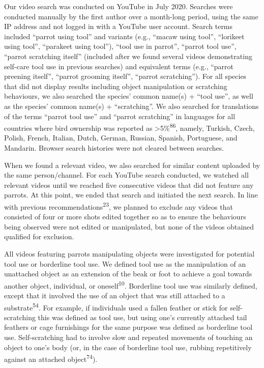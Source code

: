\documentclass[
  man, donotrepeattitle,floatsintext]{apa6}
\begin{document}
Our video search was conducted on YouTube in July 2020. Searches were conducted
manually by the first author over a month-long period, using the same IP address
and not logged in with a YouTube user account. Search terms included
``parrot using tool'' and variants (e.g., ``macaw using tool'', ``lorikeet using
tool'', ``parakeet using tool''), ``tool use in parrot'', ``parrot tool use'', ``parrot
scratching itself'' (included after we found several videos demonstrating
self-care tool use in previous searches) and equivalent terms (e.g., ``parrot
preening itself'', ``parrot grooming itself'', ``parrot scratching''). For all
species that did not display results including object manipulation or scratching
behaviours, we also searched the species' common name(s) + ``tool use'', as well
as the species' common name(s) + ``scratching''. We also searched for translations
of the terms ``parrot tool use'' and ``parrot scratching'' in languages for all
countries where bird ownership was reported as \textgreater5\%\textsuperscript{86}, namely,
Turkish, Czech, Polish, French, Italian, Dutch, German, Russian, Spanish,
Portuguese, and Mandarin. Browser search histories were not cleared between
searches.

When we found a relevant video, we also searched for similar content uploaded by
the same person/channel. For each YouTube search conducted, we watched all
relevant videos until we reached five consecutive videos that did not feature
any parrots. At this point, we ended that search and initiated the next search.
In line with previous recommendations\textsuperscript{23}, we planned to exclude any
videos that consisted of four or more shots edited together so as to ensure the
behaviours being observed were not edited or manipulated, but none of the videos
obtained qualified for exclusion.

All videos featuring parrots manipulating objects were investigated for
potential tool use or borderline tool use. We defined tool use as the
manipulation of an unattached object as an extension of the beak or foot to
achieve a goal towards another object, individual, or oneself\textsuperscript{10}.
Borderline tool use was similarly defined, except that it involved the use of an
object that was still attached to a substrate\textsuperscript{54}. For example, if
individuals used a fallen feather or stick for self-scratching this was defined
as tool use, but using one's currently attached tail feathers or cage
furnishings for the same purpose was defined as borderline tool use.
Self-scratching had to involve slow and repeated movements of touching an object
to one's body (or, in the case of borderline tool use, rubbing repetitively
against an attached object\textsuperscript{74}).
\end{document}
